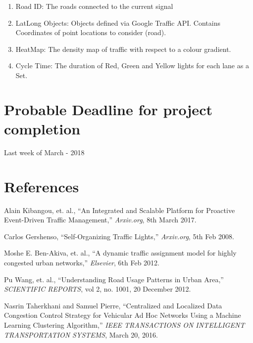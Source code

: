 \documentclass[12pt,a4paper,final]{article}
\begin{document}
\begin{flushleft}
\begin{enumerate}
\item
Road ID: The roads connected to the current signal
\item
LatLong Objects: Objects defined via Google Traffic API. Contains Coordinates of point locations to consider (road).
\item
HeatMap: The density map of traffic with respect to a colour gradient.
\item
Cycle Time: The duration of Red, Green and Yellow lights for each lane as a Set.
\end{enumerate}

\newpage
\noindent

\section{Probable Deadline for project completion}
Last week of March - 2018


\section{References}

\begin{enumerate}[label={[\arabic*]}]
\item Alain Kibangou, et. al., “An Integrated and Scalable Platform for
 Proactive Event-Driven Traffic Management,” \textit{Arxiv.org}, 8th March 2017.

\item Carlos Gershenso, “Self-Organizing Traffic Lights,” \textit{Arxiv.org},
 5th Feb 2008.

\item Moshe E. Ben-Akiva, et. al., “A dynamic traffic assignment model
 for highly congested urban networks,” \textit{Elsevier}, 6th Feb 2012.

\item Pu Wang, et. al., “Understanding Road Usage Patterns in Urban
 Area,” \textit{SCIENTIFIC REPORTS}, vol 2, no. 1001, 20 December 2012.

\item Nasrin Taherkhani and Samuel Pierre, “Centralized and Localized
 Data Congestion Control Strategy for Vehicular Ad Hoc Networks Using
 a Machine Learning Clustering Algorithm,” \textit{IEEE TRANSACTIONS ON
 INTELLIGENT TRANSPORTATION SYSTEMS}, March 20, 2016.

\end{enumerate}
\end{flushleft}
\end{document}
